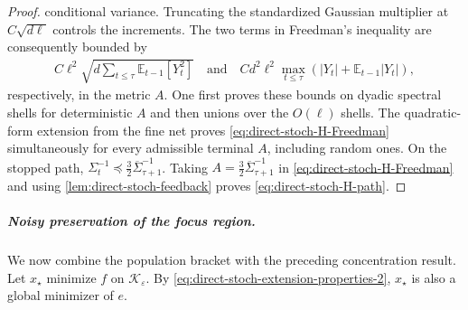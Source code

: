 \documentclass{article}
\theoremstyle{plain}
\theoremstyle{definition}
\theoremstyle{plain}
\newcommand{\E}{\mathbb E}
\newcommand{\cK}{\mathcal K}
\begin{document}
\begin{proof}
    conditional variance.  Truncating the standardized Gaussian
    multiplier at $C\sqrt{d\ell}$ controls the increments.  The two
    terms in Freedman's inequality are consequently bounded by
    \begin{align}
        C\ell^2
        \sqrt{d\sum_{t\leq\tau}\E_{t-1}[Y_t^2]}
        \quad\text{and}\quad
        Cd^2\ell^2
        \max_{t\leq\tau}
        (|Y_t|+\E_{t-1}|Y_t|),
    \end{align}
    respectively, in the metric $A$.  One first proves these bounds
    on dyadic spectral shells for deterministic $A$ and then unions
    over the $O(\ell)$ shells.  The quadratic-form extension from the
    fine net proves \eqref{eq:direct-stoch-H-Freedman} simultaneously
    for every admissible terminal $A$, including random ones.  On the stopped path,
    $\Sigma_t^{-1}\preceq\frac32
        \overline\Sigma_{\tau+1}^{-1}$.  Taking
    $A=\frac32\overline\Sigma_{\tau+1}^{-1}$ in
    \eqref{eq:direct-stoch-H-Freedman} and using
    \cref{lem:direct-stoch-feedback} proves
    \eqref{eq:direct-stoch-H-path}.
\end{proof}

\subparagraph{Noisy preservation of the focus region.}
We now combine the population bracket with the preceding concentration
result.  Let $x_\star$ minimize $f$ on $\cK_\varepsilon$.  By
\eqref{eq:direct-stoch-extension-properties-2}, $x_\star$ is also a
global minimizer of $e$.
\end{document}
